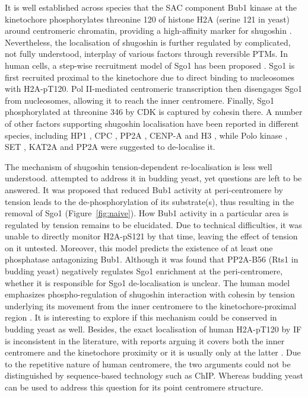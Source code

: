 It is well established across species that the SAC component Bub1 kinase at the kinetochore phosphorylates threonine 120 of histone H2A (serine 121 in yeast) around centromeric chromatin, providing a high-affinity marker for shugoshin \citep{Rivera2012, Boyarchuk2007Bub1Centromere, Williams2017Bub1Kinetochores, Kitajima2005, Perera2010, Tang2004, Fernius2007Bub1Mitosis, Kiburz2005, Kawashima2010a}. Nevertheless, the localisation of shugoshin is further regulated by complicated, not fully understood, interplay of various factors through reversible PTMs. In human cells, a step-wise recruitment model of Sgo1 has been proposed \citep{Liu2013, Liu2013a, Liu2015}. Sgo1 is first recruited proximal to the kinetochore due to direct binding to nucleosomes with H2A-pT120. Pol II-mediated centromeric transcription then disengages Sgo1 from nucleosomes, allowing it to reach the inner centromere. Finally, Sgo1 phosphorylated at threonine 346 by CDK is captured by cohesin there. A number of other factors supporting shugoshin localisation have been reported in different species, including HP1 \citep{Yamagishi2008, Kang2011, Perera2010}, CPC \citep{Huang2007, Tanno2010, Rivera2012, Kawashima2007, Boyarchuk2007Bub1Centromere, Resnick2006INCENPDrosophila}, PP2A \citep{Tang2006a}, CENP-A \citep{Petty2018ConnectingCheckpoint, Eot-Houllier2018AuroraFatigue, Mishra2018BuddingChromatin} and H3 \citep{Buehl2018a, Luo2016}, while Polo kinase \citep{Clarke2005}, SET \citep{Qu2019SETSegregation, Krishnan2017Phospho-H1Mitosis}, KAT2A \citep{Petty2018ConnectingCheckpoint} and PP2A \citep{Nerusheva2014} were suggested to de-localise it. 

The mechanism of shugoshin tension-dependent re-localisation is less well understood. \cite{Nerusheva2014} attempted to address it in budding yeast, yet questions are left to be answered. It was proposed that reduced Bub1 activity at peri-centromere by tension leads to the de-phosphorylation of its substrate(s), thus resulting in the removal of Sgo1 (Figure~\ref{fig:naive}). How Bub1 activity in a particular area is regulated by tension remains to be elucidated. Due to technical difficulties, it was unable to directly monitor H2A-pS121 by that time, leaving the effect of tension on it untested. Moreover, this model predicts the existence of at least one phosphatase antagonizing Bub1. Although it was found that PP2A-B56 (Rts1 in budding yeast) negatively regulates Sgo1 enrichment at the peri-centromere, whether it is responsible for Sgo1 de-localisation is unclear. The human model emphasizes phospho-regulation of shugoshin interaction with cohesin by tension underlying its movement from the inner centromere to the kinetochore-proximal region \citep{Liu2013, Liu2015}. It is interesting to explore if this mechanism could be conserved in budding yeast as well. Besides, the exact localisation of human H2A-pT120 by IF is inconsistent in the literature, with reports arguing it covers both the inner centromere \citep{Yamagishi2010} and the kinetochore proximity or it is usually only at the latter \citep{Liu2013}. Due to the repetitive nature of human centromere, the two arguments could not be distinguished by sequence-based technology such as ChIP. Whereas budding yeast can be used to address this question for its point centromere structure. 

